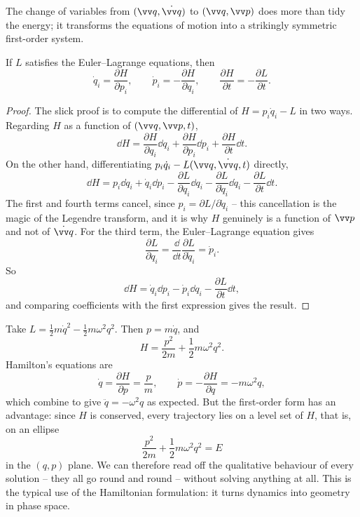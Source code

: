 \documentclass[a4paper]{scrartcl}
\begin{document}
The change of variables from $(\vv q, \dot{\vv q})$ to $(\vv q, \vv p)$ does more than tidy the energy; it transforms the equations of motion into a strikingly symmetric first-order system.

\begin{theorem}
	If $L$ satisfies the Euler--Lagrange equations, then
	$$
	\dot q_i = \frac{\partial H}{\partial p_i}, \qquad \dot p_i = -\frac{\partial H}{\partial q_i}, \qquad \frac{\partial H}{\partial t} = -\frac{\partial L}{\partial t}.
	$$
\end{theorem}
\begin{proof}
	The slick proof is to compute the differential of $H = p_i\dot q_i - L$ in two ways. Regarding $H$ as a function of $(\vv q, \vv p, t)$,
	$$
	\dd H = \frac{\partial H}{\partial q_i}\dd q_i + \frac{\partial H}{\partial p_i}\dd p_i + \frac{\partial H}{\partial t}\dd t.
	$$
	On the other hand, differentiating $p_i \dot q_i - L(\vv q, \dot{\vv q}, t)$ directly,
	$$
	\dd H = p_i \dd\dot q_i + \dot q_i \dd p_i - \frac{\partial L}{\partial q_i}\dd q_i - \frac{\partial L}{\partial \dot q_i}\dd \dot q_i - \frac{\partial L}{\partial t}\dd t.
	$$
	The first and fourth terms cancel, since $p_i = \partial L/\partial \dot q_i$ -- this cancellation is the magic of the Legendre transform, and it is why $H$ genuinely is a function of $\vv p$ and not of $\dot{\vv q}$. For the third term, the Euler--Lagrange equation gives
	$$
	\frac{\partial L}{\partial q_i} = \frac{\dd}{\dd t}\frac{\partial L}{\partial \dot q_i} = \dot p_i.
	$$
	So
	$$
	\dd H = \dot q_i \dd p_i - \dot p_i \dd q_i - \frac{\partial L}{\partial t}\dd t,
	$$
	and comparing coefficients with the first expression gives the result.
\end{proof}

\begin{example}
	Take $L = \frac12 m\dot q^2 - \frac12 m\omega^2 q^2$. Then $p = m\dot q$, and
	$$
	H = \frac{p^2}{2m} + \frac{1}{2}m\omega^2 q^2.
	$$
	Hamilton's equations are
	$$
	\dot q = \frac{\partial H}{\partial p} = \frac{p}{m}, \qquad \dot p = -\frac{\partial H}{\partial q} = -m\omega^2 q,
	$$
	which combine to give $\ddot q = -\omega^2 q$ as expected. But the first-order form has an advantage: since $H$ is conserved, every trajectory lies on a level set of $H$, that is, on an ellipse
	$$
	\frac{p^2}{2m} + \frac{1}{2}m\omega^2q^2 = E
	$$
	in the $(q, p)$ plane. We can therefore read off the qualitative behaviour of every solution -- they all go round and round -- without solving anything at all. This is the typical use of the Hamiltonian formulation: it turns dynamics into geometry in phase space.
\end{example}
\end{document}
